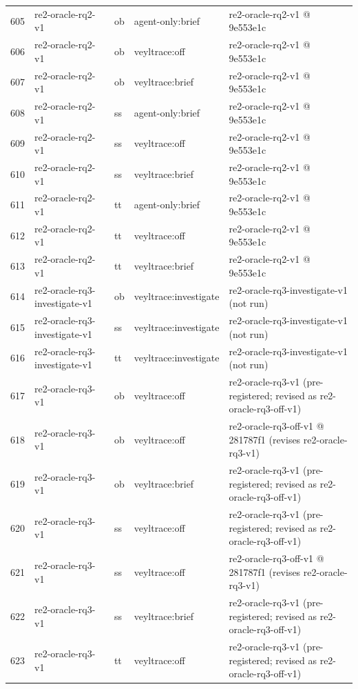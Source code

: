 \begin{longtable}{@{}r>{\raggedright\arraybackslash}p{87.0pt}>{\raggedright\arraybackslash}p{18.0pt}>{\raggedright\arraybackslash}p{63.0pt}>{\raggedright\arraybackslash}p{108.0pt}@{}}
605 & re2-oracle-rq2-v1 & ob & agent-only:brief & re2-oracle-rq2-v1 @ 9e553e1c \\
606 & re2-oracle-rq2-v1 & ob & veyltrace:off & re2-oracle-rq2-v1 @ 9e553e1c \\
607 & re2-oracle-rq2-v1 & ob & veyltrace:brief & re2-oracle-rq2-v1 @ 9e553e1c \\
608 & re2-oracle-rq2-v1 & ss & agent-only:brief & re2-oracle-rq2-v1 @ 9e553e1c \\
609 & re2-oracle-rq2-v1 & ss & veyltrace:off & re2-oracle-rq2-v1 @ 9e553e1c \\
610 & re2-oracle-rq2-v1 & ss & veyltrace:brief & re2-oracle-rq2-v1 @ 9e553e1c \\
611 & re2-oracle-rq2-v1 & tt & agent-only:brief & re2-oracle-rq2-v1 @ 9e553e1c \\
612 & re2-oracle-rq2-v1 & tt & veyltrace:off & re2-oracle-rq2-v1 @ 9e553e1c \\
613 & re2-oracle-rq2-v1 & tt & veyltrace:brief & re2-oracle-rq2-v1 @ 9e553e1c \\
614 & re2-oracle-rq3-investigate-v1 & ob & veyltrace:investigate & re2-oracle-rq3-investigate-v1 (not run) \\
615 & re2-oracle-rq3-investigate-v1 & ss & veyltrace:investigate & re2-oracle-rq3-investigate-v1 (not run) \\
616 & re2-oracle-rq3-investigate-v1 & tt & veyltrace:investigate & re2-oracle-rq3-investigate-v1 (not run) \\
617 & re2-oracle-rq3-v1 & ob & veyltrace:off & re2-oracle-rq3-v1 (pre-registered; revised as re2-oracle-rq3-off-v1) \\
618 & re2-oracle-rq3-v1 & ob & veyltrace:off & re2-oracle-rq3-off-v1 @ 281787f1 (revises re2-oracle-rq3-v1) \\
619 & re2-oracle-rq3-v1 & ob & veyltrace:brief & re2-oracle-rq3-v1 (pre-registered; revised as re2-oracle-rq3-off-v1) \\
620 & re2-oracle-rq3-v1 & ss & veyltrace:off & re2-oracle-rq3-v1 (pre-registered; revised as re2-oracle-rq3-off-v1) \\
621 & re2-oracle-rq3-v1 & ss & veyltrace:off & re2-oracle-rq3-off-v1 @ 281787f1 (revises re2-oracle-rq3-v1) \\
622 & re2-oracle-rq3-v1 & ss & veyltrace:brief & re2-oracle-rq3-v1 (pre-registered; revised as re2-oracle-rq3-off-v1) \\
623 & re2-oracle-rq3-v1 & tt & veyltrace:off & re2-oracle-rq3-v1 (pre-registered; revised as re2-oracle-rq3-off-v1) \\

\end{longtable}
